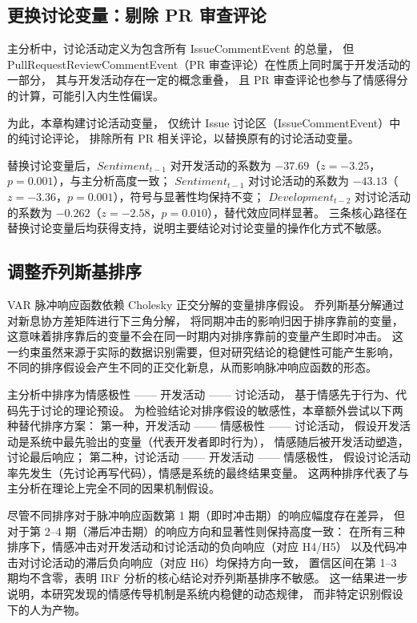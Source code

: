 \documentclass[
    type = master, %
    degree = professional,        %
    decl-page,  %
    twoside,                %
    fontset = fandol %
  ]{njuthesis}
\begin{document}
\subsection{更换讨论变量：剔除 PR 审查评论}

主分析中，讨论活动定义为包含所有 IssueCommentEvent 的总量，
但 PullRequestReviewCommentEvent（PR 审查评论）在性质上同时属于开发活动的一部分，
其与开发活动存在一定的概念重叠，
且 PR 审查评论也参与了情感得分的计算，可能引入内生性偏误。

为此，本章构建讨论活动变量，
仅统计 Issue 讨论区（IssueCommentEvent）中的纯讨论评论，
排除所有 PR 相关评论，以替换原有的讨论活动变量。

替换讨论变量后，$Sentiment_{t-1}$ 对开发活动的系数为
$-37.69$（$z = -3.25$，$p = 0.001$），与主分析高度一致；
$Sentiment_{t-1}$ 对讨论活动的系数为
$-43.13$（$z = -3.36$，$p = 0.001$），符号与显著性均保持不变；
$Development_{t-2}$ 对讨论活动的系数为
$-0.262$（$z = -2.58$，$p = 0.010$），替代效应同样显著。
三条核心路径在替换讨论变量后均获得支持，说明主要结论对讨论变量的操作化方式不敏感。

\subsection{调整乔列斯基排序}

VAR 脉冲响应函数依赖 Cholesky 正交分解的变量排序假设。
乔列斯基分解通过对新息协方差矩阵进行下三角分解，
将同期冲击的影响归因于排序靠前的变量，
这意味着排序靠后的变量不会在同一时期内对排序靠前的变量产生即时冲击。
这一约束虽然来源于实际的数据识别需要，但对研究结论的稳健性可能产生影响，
不同的排序假设会产生不同的正交化新息，从而影响脉冲响应函数的形态。

主分析中排序为情感极性 —— 开发活动 —— 讨论活动，
基于情感先于行为、代码先于讨论的理论预设。
为检验结论对排序假设的敏感性，本章额外尝试以下两种替代排序方案：
第一种，开发活动 —— 情感极性 —— 讨论活动，
假设开发活动是系统中最先验出的变量（代表开发者即时行为），
情感随后被开发活动塑造，讨论最后响应；
第二种，讨论活动 —— 开发活动 —— 情感极性，
假设讨论活动率先发生（先讨论再写代码），情感是系统的最终结果变量。
这两种排序代表了与主分析在理论上完全不同的因果机制假设。

尽管不同排序对于脉冲响应函数第 1 期（即时冲击期）的响应幅度存在差异，
但对于第 2--4 期（滞后冲击期）的响应方向和显著性则保持高度一致：
在所有三种排序下，情感冲击对开发活动和讨论活动的负向响应（对应 H4/H5）
以及代码冲击对讨论活动的滞后负向响应（对应 H6）均保持方向一致，
置信区间在第 1--3 期均不含零，表明 IRF 分析的核心结论对乔列斯基排序不敏感。
这一结果进一步说明，本研究发现的情感传导机制是系统内稳健的动态规律，
而非特定识别假设下的人为产物。
\end{document}
